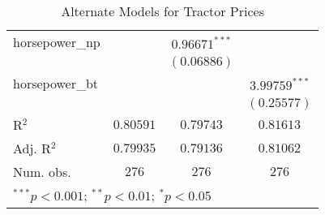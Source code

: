 \begin{table}
\begin{center}
\begin{tabular}{l c c c}
horsepower\_np      &                  & $0.96671^{***}$  &                  \\
                    &                  & $(0.06886)$      &                  \\
horsepower\_bt      &                  &                  & $3.99759^{***}$  \\
                    &                  &                  & $(0.25577)$      \\
\hline
R$^2$               & $0.80591$        & $0.79743$        & $0.81613$        \\
Adj. R$^2$          & $0.79935$        & $0.79136$        & $0.81062$        \\
Num. obs.           & $276$            & $276$            & $276$            \\
\hline
\multicolumn{4}{l}{\scriptsize{$^{***}p<0.001$; $^{**}p<0.01$; $^{*}p<0.05$}}
\end{tabular}
\caption{Alternate Models for Tractor Prices}
\label{tab:reg_sq_horse_sp_bt}
\end{center}
\end{table}
